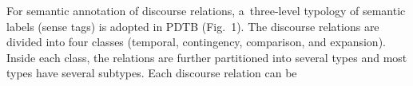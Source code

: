 \begin{multicols}{2}
  For semantic annotation of discourse relations, a~three-level typology of semantic 
labels (sense tags) is adopted in PDTB (Fig.~1). The discourse relations are 
divided into four classes (temporal, contingency, comparison, and expansion). 
Inside each 
class, the relations are further partitioned into several types and most types have 
several subtypes. Each discourse relation can be\linebreak\vspace*{-12pt}

\pagebreak

\end{multicols}
  \begin{figure*} %
  \vspace*{1pt}
 \begin{center}
 \mbox{%
 \epsfxsize=115.088mm 
 }
 \end{center}
\vspace*{-13pt}
  \vspace*{-4pt}
   \end{figure*}

